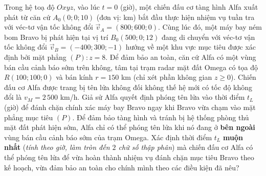 \begin{bt}%
	Trong hệ toạ độ $Oxyz$, vào lúc $t=0$ (giờ), một chiến đấu cơ tàng hình Alfa xuất phát từ căn cứ $A_0(0;0;10)$ (đơn vị: km) bắt đầu thực hiện nhiệm vụ tuần tra với véc-tơ vận tốc không đổi $\overrightarrow{v}_A=(800;600;0)$. Cùng lúc đó, một máy bay ném bom Bravo bị phát hiện tại vị trí $B_0(500;0;12)$ đang di chuyển với véc-tơ vận tốc không đổi $\overrightarrow{v}_B=(-400;300;-1)$ hướng về một khu vực mục tiêu được xác định bởi mặt phẳng $(P)\colon z=8$. Để đảm bảo an toàn, căn cứ Alfa có một vùng bán cầu cảnh báo sớm trên không, tâm tại trạm radar mặt đất Omega có tọa độ $R(100;100;0)$ và bán kính $r=150$ km (chỉ xét phần không gian $z \ge 0$). Chiến đấu cơ Alfa  được trang bị tên lửa không đối không thế hệ mới có tốc độ không đổi là $v_M=2\,500$ km/h. Giả sử Alfa quyết định phóng tên lửa vào thời điểm $t_L$ (giờ) để đánh chặn chính xác máy bay Bravo ngay khi Bravo vừa chạm vào mặt phẳng mục tiêu $(P)$. Để đảm bảo tàng hình và tránh bị hệ thống phòng thủ mặt đất phát hiện sớm, Alfa chỉ có thể phóng tên lửa khi nó đang ở \textbf{bên ngoài} vùng bán cầu cảnh báo sớm của trạm Omega. Xác định thời điểm $t_L$ \textbf{muộn nhất} (\textit{tính theo giờ, làm tròn đến $2$ chữ số thập phân}) mà chiến đấu cơ Alfa có thể phóng tên lửa để vừa hoàn thành nhiệm vụ đánh chặn mục tiêu Bravo theo kế hoạch, vừa đảm bảo an toàn cho chính mình theo các điều kiện đã nêu?
\end{bt}

